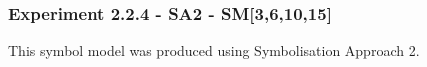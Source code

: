 

\newpage



\subsubsection{Experiment 2.2.4 - SA2 - SM[3,6,10,15]}
This symbol model was produced using Symbolisation Approach 2. 
%
%
%

%
%


